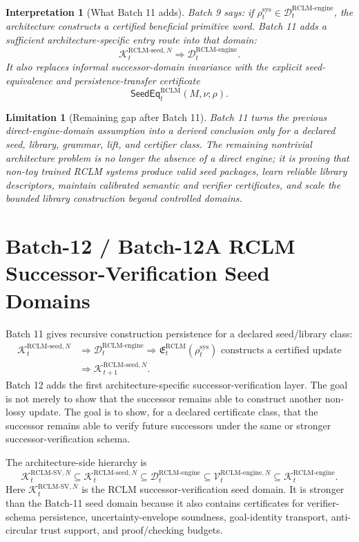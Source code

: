 \documentclass[11pt,a4paper]{article}
\newtheorem{limitation}[theorem]{Limitation}
\newtheorem{interpretation}[theorem]{Interpretation}
\newcommand{\Kcal}{\mathcal K}
\newcommand{\Vcal}{\mathcal V}
\newcommand{\Dcal}{\mathcal D}
\newcommand{\RCLM}{\mathrm{RCLM}}
\newcommand{\sys}{\mathrm{sys}}
\newcommand{\engine}{\mathrm{engine}}
\begin{document}
\begin{interpretation}[What Batch 11 adds]
Batch 9 says: if \(\rho_t^{\sys}\in\Dcal_t^{\RCLM\text{-}\engine}\), the architecture constructs a certified beneficial primitive word.  Batch 11 adds a sufficient architecture-specific entry route into that domain:
\[
\Kcal_t^{\RCLM\text{-}\mathrm{seed},N}
\Rightarrow
\Dcal_t^{\RCLM\text{-}\engine}.
\]
It also replaces informal successor-domain invariance with the explicit seed-equivalence and persistence-transfer certificate
\[
\mathsf{SeedEq}_t^{\RCLM}(M,\nu;\rho).
\]
\end{interpretation}

\begin{limitation}[Remaining gap after Batch 11]
Batch 11 turns the previous direct-engine-domain assumption into a derived conclusion only for a declared seed, library, grammar, lift, and certifier class.  The remaining nontrivial architecture problem is no longer the absence of a direct engine; it is proving that non-toy trained RCLM systems produce valid seed packages, learn reliable library descriptors, maintain calibrated semantic and verifier certificates, and scale the bounded library construction beyond controlled domains.
\end{limitation}



\section{Batch-12 / Batch-12A RCLM Successor-Verification Seed Domains}
\label{sec:batch12a-rclm-successor-verification}

Batch 11 gives recursive construction persistence for a declared seed/library class:
\[
\begin{aligned}
\Kcal_t^{\RCLM\text{-}\mathrm{seed},N}
&\Longrightarrow
\Dcal_t^{\RCLM\text{-}\engine}
\Longrightarrow
\mathfrak E_t^{\RCLM}(\rho_t^{\sys})\text{ constructs a certified update}\\
&\Longrightarrow
\Kcal_{t+1}^{\RCLM\text{-}\mathrm{seed},N}.
\end{aligned}
\]
Batch 12 adds the first architecture-specific successor-verification layer.  The goal is not merely to show that the successor remains able to construct another non-lossy update.  The goal is to show, for a declared certificate class, that the successor remains able to verify future successors under the same or stronger successor-verification schema.

The architecture-side hierarchy is
\[
\boxed{
\Kcal_t^{\RCLM\text{-}\mathrm{SV},N}
\subseteq
\Kcal_t^{\RCLM\text{-}\mathrm{seed},N}
\subseteq
\Dcal_t^{\RCLM\text{-}\engine}
\subseteq
\Vcal_t^{\RCLM\text{-}\engine,N}
\subseteq
\Kcal_t^{\RCLM\text{-}\engine}.
}
\]
Here \(\Kcal_t^{\RCLM\text{-}\mathrm{SV},N}\) is the RCLM successor-verification seed domain. It is stronger than the Batch-11 seed domain because it also contains certificates for verifier-schema persistence, uncertainty-envelope soundness, goal-identity transport, anti-circular trust support, and proof/checking budgets.
\end{document}
